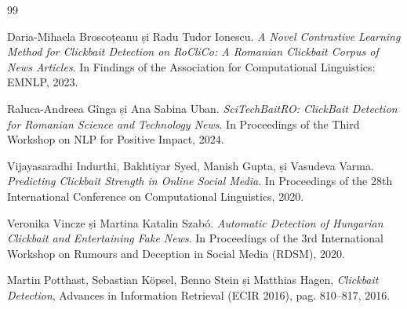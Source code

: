 \documentclass[12pt, a4paper]{article}
\begin{document}
\newpage
\begin{thebibliography}{99}

Daria-Mihaela Broscoțeanu și Radu Tudor Ionescu. \textit{A Novel Contrastive Learning Method for Clickbait Detection on RoCliCo: A Romanian Clickbait Corpus of News Articles}. In Findings of the Association for Computational Linguistics: EMNLP, 2023.

Raluca-Andreea Gînga și Ana Sabina Uban. \textit{SciTechBaitRO: ClickBait Detection for Romanian Science and Technology News}. In Proceedings of the Third Workshop on NLP for Positive Impact, 2024.

Vijayasaradhi Indurthi, Bakhtiyar Syed, Manish Gupta, și Vasudeva Varma. \textit{Predicting Clickbait Strength in Online Social Media}. In Proceedings of the 28th International Conference on Computational Linguistics, 2020.

Veronika Vincze și Martina Katalin Szabó. \textit{Automatic Detection of Hungarian Clickbait and Entertaining Fake News}. In Proceedings of the 3rd International Workshop on Rumours and Deception in Social Media (RDSM), 2020.

Martin Potthast, Sebastian Köpsel, Benno Stein și Matthias Hagen, \textit{Clickbait Detection}, Advances in Information Retrieval (ECIR 2016), pag. 810--817, 2016.

\end{thebibliography}
\end{document}
